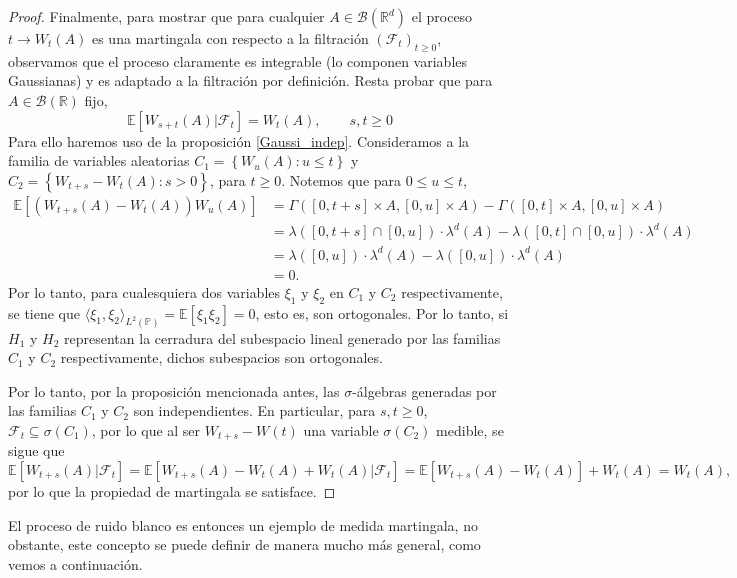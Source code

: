 \documentclass[letterpaper,twoside,12pt]{book}
\newcommand{\R}{\mathbb{R}}
\newcommand{\F}{\mathcal{F}}
\newcommand{\B}{\mathcal{B}}
\newcommand{\E}{\mathbb{E}}
\renewcommand{\P}{\mathbb{P}}
\newcommand{\1}{\mathds{1}}
\renewcommand{\to}{\rightarrow}
\theoremstyle{definition}
\theoremstyle{definition}
\theoremstyle{definition}
\theoremstyle{definition}
\theoremstyle{definition}
\theoremstyle{definition}
\theoremstyle{definition}
\begin{document}
\begin{proof}
  Finalmente, para mostrar que para cualquier $A\in \B(\R^{d})$ el proceso $t\to W_t(A)$ es una martingala con respecto a la filtración $(\F_t)_{t\geq0}$, observamos que el proceso claramente es integrable (lo componen variables Gaussianas) y es adaptado a la filtración por definición. Resta probar que para $A\in \B(\R)$ fijo,
  \[
  \E\left[W_{s+t}(A)\lvert \F_t\right]=W_t(A), \qquad s,t\geq0  
  \]
  Para ello haremos uso de la proposición \ref{Gaussi_indep}. Consideramos a la familia de variables aleatorias $C_1=\left\{W_u(A):u\leq t\right\}$ y
  $C_2=\left\{W_{t+s}-W_t(A):s>0 \right\}$, para $t\geq0$. Notemos que para $0\le u\le t$,
  \begin{align*}
    \E\left[(W_{t+s}(A)-W_t(A))W_u(A)\right]&=\Gamma([0,t+s]\times A, [0,u]\times A)-\Gamma([0,t]\times A,[0,u]\times A)\\
    &=\lambda([0,t+s]\cap[0,u])\cdot\lambda^{d}(A)-\lambda([0,t]\cap[0,u])\cdot\lambda^{d}(A)\\
    &=\lambda([0,u])\cdot\lambda^{d}(A)-\lambda([0,u])\cdot\lambda^{d}(A)\\
    &=0.
  \end{align*}
  Por lo tanto, para cualesquiera dos variables $\xi_1$ y $\xi_2$ en $C_1$ y $C_2$ respectivamente, se tiene que $\langle \xi_1,\xi_2\rangle_{L^2(\P)}= \E\left[\xi_1\xi_2\right]=0$, esto es, son ortogonales. Por lo tanto, si $H_1$ y $H_2$ representan la cerradura del subespacio lineal generado por las familias $C_1$ y $C_2$ respectivamente, dichos subespacios son ortogonales.
  
  Por lo tanto, por la proposición mencionada antes, las $\sigma$-álgebras generadas por las familias $C_1$ y $C_2$ son independientes. En particular, para $s,t\geq0$, $\F_t\subseteq \sigma(C_1)$, por lo que al ser $W_{t+s}-W(t)$ una variable $\sigma(C_2)$ medible, se sigue que 
  \[
      \E\left[W_{t+s}(A)|\F_t\right]=\E\left[W_{t+s}(A)-W_{t}(A)+W_t(A)|\F_t\right]=\E\left[W_{t+s}(A)-W_t(A)\right]+W_t(A)=W_t(A),
      \]
      por lo que la propiedad de martingala se satisface.  
\end{proof}

El proceso de ruido blanco es entonces un ejemplo de medida martingala, no obstante, este concepto se puede definir de manera mucho más general, como vemos a continuación.
\end{document}
